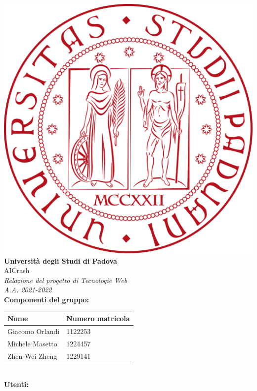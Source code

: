 \thispagestyle{empty}
\begin{titlepage}
\begin{center}
	\includegraphics[scale = 0.05]{res/UniPD_Logo.png}\\
	\bigskip
	\large \textbf{Università degli Studi di Padova}\\
	\vfill
	{\fontsize{1.5cm}{0}\selectfont AICrash}\\
	\vspace{0.7cm}
	\textit{Relazione del progetto di Tecnologie Web}\\
	\textit{A.A. 2021-2022}\\
	\vfill
	\bigskip
	\textbf{Componenti del gruppo:}\\
	\bigskip
	\begin{tabular}{| C{4.5cm} | C{4.5cm} |}
		\hline
		\textbf{Nome} & \textbf{Numero matricola}\\
		\hline
		Giacomo Orlandi & 1122253\\
		Michele Masetto & 1224457\\
		Zhen Wei Zheng & 1229141\\
		\hline
	\end{tabular}\\
	\bigskip
	\bigskip
	\textbf{Utenti:}\\
	\bigskip
	\begin{tabular}{| C{2.9cm} | C{2.9cm} | C{2.9cm} |}

\end{tabular}
\end{center}
\end{titlepage}
